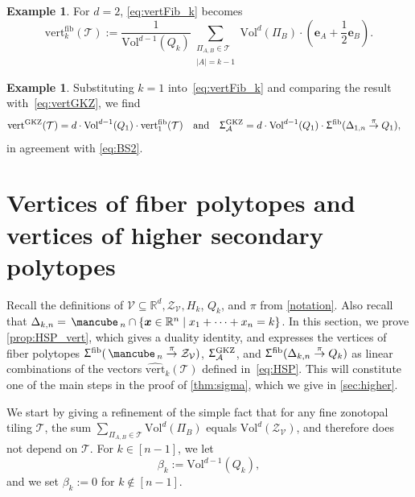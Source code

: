 \documentclass[11pt]{amsart}
\theoremstyle{plain}
\theoremstyle{definition}
\newtheorem{example}[theorem]{Example}
\def\R{\mathbb{R}}
\def\x{{\bm{x}}}
\def\A{\mathcal{A}}
\def\V{\mathcal{V}}
\def\e{{\bm{e}}}
\def\Zon{\mathcal{Z}}
\def\ZV{\Zon_\V}
\def\cube{\mbox{\,\mancube\,}}
\def\Vol{\mathrm{Vol}}
\def\GKZ{{\operatorname{GKZ}}}
\newcommand\wh[1]{\hstretch{2}{\hat{\hstretch{0.5}{#1}}}}
\def\vert{\mathrm{vert}}
\def\vertHSP{\wh\vert}
\def\vertHSP{\widehat{\vert}}
\def\vertGKZ{\vert^\GKZ}
\def\vertFib{\vert^\fiber}
\def\fiber{{\operatorname{fib}}}
\def\FibPoly{\Upsigma^\fiber}
\def\SigmaGKZ{\Upsigma_\A^{\GKZ}}
\def\pito{\overset \pi \to}
\def\VC{\V}
\def\Tcal{\mathcal{T}}
\def\Tiling{\Tcal}
\def\tile{\Pi}
\newcommand\summa[2]{\sum_{\substack{#1 \\ #2}}}
\def\sumlevel#1{\summa{\tile_{A,B}\in\Tiling}{|A|=#1}}
\def\Voldd{\Vol^{d-1}}
\def\Vold{\Vol^d}
\def\VolX(#1){\Vol^d(\tile_{#1})}
\def\VolB{\VolX(B)}
\let\subset\subseteq
\begin{document}
\begin{example}
For $d=2$, \eqref{eq:vertFib_k} becomes 
\begin{equation}\label{eq:vertFib_k_d=2}
 \vertFib_k(\Tiling):=\frac1{\Voldd(Q_k)}  \sumlevel{k-1} \VolB\cdot   \left( \e_A+\frac12  \e_B \right).
\end{equation}
\end{example}
\begin{example}
	Substituting $k=1$ into~\eqref{eq:vertFib_k} and comparing the result with~\eqref{eq:vertGKZ}, we find
\begin{align}
\label{eq:GKZ_FibPoly}
  \vertGKZ(\Tiling)
	&=d\cdot \Voldd(Q_1)\cdot \vertFib_1(\Tiling) \quad\text{and}\quad\SigmaGKZ=d\cdot \Voldd(Q_1)\cdot \FibPoly(\Delta_{1,n}\pito Q_1),
\end{align}
	in agreement with \eqref{eq:BS2}.
\end{example}


\section{Vertices of fiber polytopes and vertices of higher secondary polytopes}
Recall the definitions of $\V \subset \R^d, \ZV, H_k$, $Q_k$,
and $\pi$ from \cref{notation}.
Also 
recall that 
$\Delta_{k,n}=\cube_n\cap \{\x\in\R^n\mid x_1+\dots+x_n=k\}$. 
In this section, we 
prove \cref{prop:HSP_vert}, which gives a duality identity, and 
expresses the vertices of fiber polytopes $\FibPoly(\cube_n\pito \Zon_\VC)$, $\SigmaGKZ$, and $\FibPoly(\Delta_{k,n}\pito Q_k)$ as linear combinations of the vectors $\vertHSP_k(\Tiling)$ defined in~\eqref{eq:HSP}. This will constitute one of the main steps in the proof of \cref{thm:sigma}, which we give
in \cref{sec:higher}.


\def\Ar{\beta}
\def\Eupoly{A}
We start by giving a refinement of the 
simple fact that for any fine zonotopal tiling $\Tiling$, the sum $\sum_{\tile_{A,B}\in\Tiling} \VolB$ equals $\Vold(\ZV)$, and therefore does not depend on $\Tiling$. 
For $k\in[n-1]$, we let
 \begin{equation}
	\Ar_k:=\Voldd(Q_k),
\end{equation} 
and we set $\Ar_k:=0$ for $k\notin[n-1]$.
\end{document}
